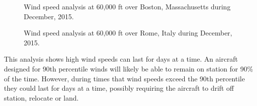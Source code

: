 \begin{figure}[h!]
 \begin{subfigmatrix}{2}%
 \end{subfigmatrix}
 \caption{Wind speed analysis at 60,000 ft over Boston, Massachusetts during December, 2015.}
 \label{f:bostonwinds}
\end{figure}

\begin{figure}[h!]
 \begin{subfigmatrix}{2}%
 \end{subfigmatrix}
 \caption{Wind speed analysis at 60,000 ft over Rome, Italy during December, 2015.}
 \label{f:romewinds}
\end{figure}

This analysis shows high wind speeds can last for days at a time.  
An aircraft designed for 90th percentile winds will likely be able to remain on station for 90\% of the time.  
However, during times that wind speeds exceed the 90th percentile they could last for days at a time, possibly requiring the aircraft to drift off station, relocate or land. 

